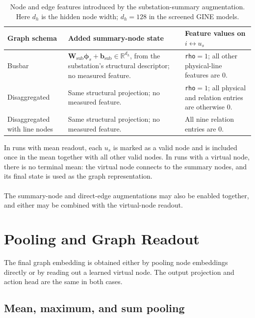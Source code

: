 \begin{table}[H]
  \centering
  \small
  \caption{Node and edge features introduced by the substation-summary
  augmentation. Here $d_h$ is the hidden node width; $d_h=128$ in the screened
  GINE models.}
  \label{tab:summary-node-augmentation-features}
  \setlength{\tabcolsep}{4pt}
  \begin{tabular}{L{0.20\textwidth}L{0.31\textwidth}L{0.39\textwidth}}
    \toprule
    Graph schema & Added summary-node state & Feature values on $i\leftrightarrow u_s$ \\
    \midrule
    Busbar & $\mathbf W_{\mathrm{sub}}\boldsymbol\phi_s+\mathbf b_{\mathrm{sub}}\in\mathbb{R}^{d_h}$, from the substation's structural descriptor; no measured feature. & \texttt{rho}$=1$; all other physical-line features are $0$. \\
    Disaggregated & Same structural projection; no measured feature. & \texttt{rho}$=1$; all physical and relation entries are otherwise $0$. \\
    Disaggregated with line nodes & Same structural projection; no measured feature. & All nine relation entries are $0$. \\
    \bottomrule
  \end{tabular}
\end{table}

\noindent In runs with mean readout, each $u_s$ is marked as a valid node and is
included once in the mean together with all other valid nodes. In runs with a virtual
node, there is no terminal mean: the virtual node connects to the summary nodes,
and its final state is used as the graph representation.
\\
\\
The summary-node and direct-edge augmentations may also be enabled together,
and either may be combined with the virtual-node readout.


\section{Pooling and Graph Readout}
\label{sec:graph-pooling}

The final graph embedding is obtained either by pooling node embeddings directly
or by reading out a learned virtual node. The output projection and action head
are the same in both cases.

\subsection{Mean, maximum, and sum pooling}
\label{subsec:graph-mean-pooling}

